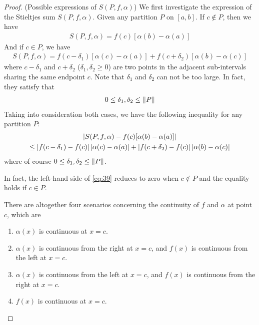 \documentclass[thmcnt=section, 12pt]{my-elegantbook}
\begin{document}
\begin{proof}
    (Possible expressions of $S(P,f,\alpha)$) We first investigate the expression of the Stieltjes sum $S(P,f,\alpha)$. Given any partition $P$ on $[a, b]$. If $c \notin P$, then we have 
    \begin{align*}
        S(P,f,\alpha) = f(c) [\alpha(b) - \alpha(a)]
    \end{align*}
    And if $c \in P$, we have 
    \begin{align*}
        S(P,f,\alpha) 
        = f(c-\delta_1) [\alpha(c) - \alpha(a)]
        + f(c+\delta_2) [\alpha(b) - \alpha(c)]
    \end{align*}
    where $c-\delta_1$ and $c+\delta_2$ ($\delta_1, \delta_2 \geq 0$) are two points in the adjacent sub-intervals sharing the same endpoint $c$. Note that $\delta_1$ and $\delta_2$ can not be too large. In fact, they satisfy that 
    \begin{align*}
        0 \leq \delta_1, \delta_2 \leq \left\lVert P \right\rVert
    \end{align*}
    Taking into consideration both cases, we have the following inequality for any partition $P$:
    \begin{multline}
        \left\lvert 
            S(P,f,\alpha)
            - f(c) [\alpha(b) - \alpha(a)]
         \right\rvert \\
        \leq \left\lvert f(c-\delta_1) - f(c) \right\rvert \left\lvert \alpha(c) - \alpha(a) \right\rvert
        + \left\lvert f(c+\delta_2) - f(c) \right\rvert \left\lvert \alpha(b) - \alpha(c) \right\rvert
        \label{eq:39}
    \end{multline}
    where of course $0 \leq \delta_1, \delta_2 \leq \left\lVert P \right\rVert$. 

    \begin{note}
        In fact, the left-hand side of \eqref{eq:39} reduces to zero when $c \notin P$ and the equality holds if $c \in P$.
    \end{note}

    \par There are altogether four scenarios concerning the continuity of $f$ and $\alpha$ at point $c$, which are 
    \begin{enumerate}
        \item $\alpha(x)$ is continuous at $x=c$.
        \item $\alpha(x)$ is continuous from the right at $x=c$, and $f(x)$ is continuous from the left at $x=c$.
        \item $\alpha(x)$ is continuous from the left at $x=c$, and $f(x)$ is continuous from the right at $x=c$.
        \item $f(x)$ is continuous at $x=c$.
    \end{enumerate}


\end{proof}
\end{document}
